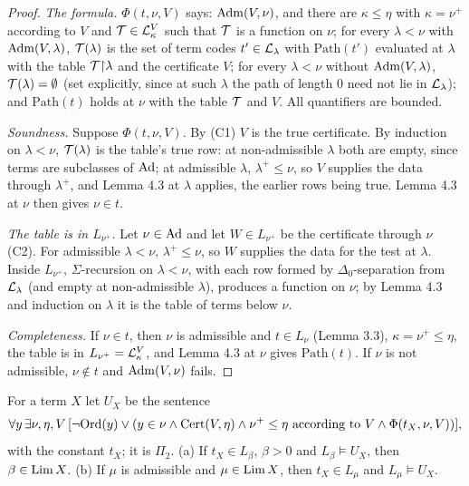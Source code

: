 \documentclass[11pt]{article}
\begin{document}
\begin{proof}
\emph{The formula.} $\Phi(t,\nu,V)$ says: $\mathrm{Adm}(V,\nu)$, and there are $\kappa \le \eta$ with $\kappa = \nu^+$
according to $V$ and $\mathcal{T} \in \mathcal{L}^V_\kappa$ such that $\mathcal{T}$ is a function on $\nu$; for every $\lambda < \nu$ with
$\mathrm{Adm}(V,\lambda)$, $\mathcal{T}(\lambda)$ is the set of term codes $t' \in \mathcal{L}_\lambda$ with $\mathrm{Path}(t')$ evaluated at
$\lambda$ with the table $\mathcal{T}{\restriction}\lambda$ and the certificate $V$; for every $\lambda < \nu$ without
$\mathrm{Adm}(V,\lambda)$, $\mathcal{T}(\lambda) = \emptyset$ (set explicitly, since at such $\lambda$ the path of length $0$ need not
lie in $\mathcal{L}_\lambda$); and $\mathrm{Path}(t)$ holds at $\nu$ with the table $\mathcal{T}$ and $V$. All quantifiers are bounded.

\emph{Soundness.} Suppose $\Phi(t,\nu,V)$. By (C1) $V$ is the true certificate. By induction on $\lambda < \nu$,
$\mathcal{T}(\lambda)$ is the table's true row: at non-admissible $\lambda$ both are empty, since terms are subclasses of
$\mathrm{Ad}$; at admissible $\lambda$, $\lambda^+ \le \nu$, so $V$ supplies the data through $\lambda^+$, and Lemma 4.3 at
$\lambda$ applies, the earlier rows being true. Lemma 4.3 at $\nu$ then gives $\nu \in t$.

\emph{The table is in $L_{\nu^+}$.} Let $\nu \in \mathrm{Ad}$ and let $W \in L_{\nu^+}$ be the certificate through $\nu$ (C2).
For admissible $\lambda < \nu$, $\lambda^+ \le \nu$, so $W$ supplies the data for the test at $\lambda$. Inside
$L_{\nu^+}$, $\Sigma$-recursion on $\lambda < \nu$, with each row formed by $\Delta_0$-separation from $\mathcal{L}_\lambda$
(and empty at non-admissible $\lambda$), produces a function on $\nu$; by Lemma 4.3 and induction on $\lambda$ it is the
table of terms below $\nu$.

\emph{Completeness.} If $\nu \in t$, then $\nu$ is admissible and $t \in L_\nu$ (Lemma 3.3), $\kappa = \nu^+ \le
\eta$, the table is in $L_{\nu^+} = \mathcal{L}^V_\kappa$, and Lemma 4.3 at $\nu$ gives $\mathrm{Path}(t)$. If $\nu$ is not
admissible, $\nu \notin t$ and $\mathrm{Adm}(V,\nu)$ fails.
\end{proof}

\begin{statement} For a term $X$ let $U_X$ be the sentence
\[ \forall y\, \exists \nu, \eta, V\, [\neg\mathrm{Ord}(y) \vee (y \in \nu \wedge \mathrm{Cert}(V, \eta) \wedge \nu^+ \le \eta
   \text{ according to } V \wedge \Phi(t_X, \nu, V))], \]
with the constant $t_X$; it is $\Pi_2$. (a) If $t_X \in L_\beta$, $\beta > 0$ and $L_\beta \models U_X$, then $\beta \in
\mathrm{Lim}\, X$. (b) If $\mu$ is admissible and $\mu \in \mathrm{Lim}\, X$, then $t_X \in L_\mu$ and $L_\mu \models U_X$.
\end{statement}
\end{document}
